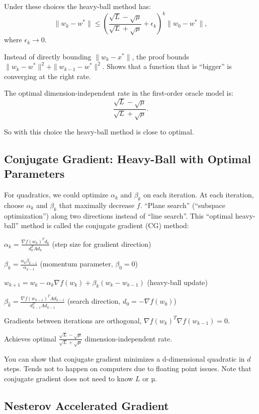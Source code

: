 \documentclass[
]{article}
\begin{document}
Under these choices the heavy-ball method has:
\[
\|w_k - w^*\| \leq \left( \frac{\sqrt{L} - \sqrt{\mu}}{\sqrt{L} + \sqrt{\mu}} + \epsilon_k \right)^k \|w_0 - w^*\|,
\]
where \(\epsilon_k \to 0\).

Instead of directly bounding \(\|w_k - x^*\|\), the proof bounds \(\|w_k - w^*\|^2 + \|w_{k-1} - w^*\|^2\). Shows that a function that is ``bigger'' is converging at the right rate.

The optimal dimension-independent rate in the first-order oracle model is:
\[
\frac{\sqrt{L} - \sqrt{\mu}}{\sqrt{L} + \sqrt{\mu}}.
\]

So with this choice the heavy-ball method is close to optimal.

\subsection{Conjugate Gradient: Heavy-Ball with Optimal Parameters}\label{conjugate-gradient-heavy-ball-with-optimal-parameters}

For quadratics, we could optimize \(\alpha_k\) and \(\beta_k\) on each iteration. At each iteration, choose \(\alpha_k\) and \(\beta_k\) that maximally decrease \(f\). ``Plane search'' (``subspace optimization'') along two directions instead of ``line search''. This ``optimal heavy-ball'' method is called the conjugate gradient (CG) method:

\(\alpha_k = \frac{\nabla f(w_k)^T d_k}{d_k^T A d_k}\) (step size for gradient direction)

\(\beta_k = \frac{\alpha_k \beta_{\hat{k}-1}}{\alpha_{k-1}}\) (momentum parameter, \(\beta_0 = 0\))

\(w_{k+1} = w_k - \alpha_k \nabla f(w_k) + \beta_k (w_k - w_{k-1})\) (heavy-ball update)

\(\beta_{\hat{k}} = \frac{\nabla f(w_{k-1})^T A d_{k-1}}{d_{k-1}^T A d_{k-1}}\) (search direction, \(d_0 = -\nabla f(w_0)\))

Gradients between iterations are orthogonal, \(\nabla f(w_k)^T \nabla f(w_{k-1}) = 0\).

Achieves optimal \(\frac{\sqrt{L} - \sqrt{\mu}}{\sqrt{L} + \sqrt{\mu}}\) dimension-independent rate.

You can show that conjugate gradient minimizes a d-dimensional quadratic in \(d\) steps. Tends not to happen on computers due to floating point issues. Note that conjugate gradient does not need to know \(L\) or \(µ\).

\subsection{Nesterov Accelerated Gradient}\label{nesterov-accelerated-gradient}
\end{document}
